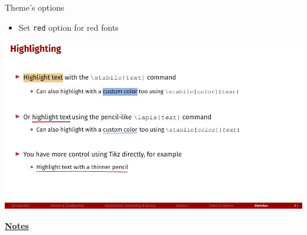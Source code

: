 \documentclass[10pt]{beamer}
\begin{document}
\begin{frame}
    {Theme's options}
    \begin{itemize}
        \item Set \texttt{red} option for red fonts
    \end{itemize}
    \begin{center}
        \begin{minipage}[b]{.6\textwidth}
            \includegraphics[width=\textwidth]{red}
        \end{minipage}
    \end{center}
\end{frame}
\begin{flushleft}
    \underline{\textbf{Notes}}\setlength{\parskip}{.15cm}\notesize\newline\par
\end{flushleft}
\end{document}
